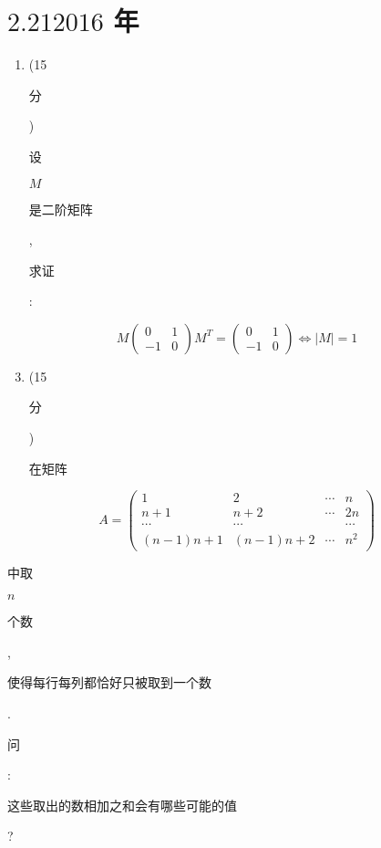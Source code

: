 \documentclass[10pt]{article}
\begin{document}
\section{$2.212016$ 年}
\begin{enumerate}
  \item (15 \begin{CJK}{UTF8}{mj}分\end{CJK}) \begin{CJK}{UTF8}{mj}设\end{CJK} $M$ \begin{CJK}{UTF8}{mj}是二阶矩阵\end{CJK}, \begin{CJK}{UTF8}{mj}求证\end{CJK}:
\end{enumerate}
$$
M\left(\begin{array}{cc}
0 & 1 \\
-1 & 0
\end{array}\right) M^{T}=\left(\begin{array}{cc}
0 & 1 \\
-1 & 0
\end{array}\right) \Leftrightarrow|M|=1
$$

\begin{enumerate}
  \setcounter{enumi}{2}
  \item (15 \begin{CJK}{UTF8}{mj}分\end{CJK}) \begin{CJK}{UTF8}{mj}在矩阵\end{CJK}
\end{enumerate}
$$
A=\left(\begin{array}{cccc}
1 & 2 & \cdots & n \\
n+1 & n+2 & \cdots & 2 n \\
\cdots & \cdots & & \cdots \\
(n-1) n+1 & (n-1) n+2 & \cdots & n^{2}
\end{array}\right)
$$
\begin{CJK}{UTF8}{mj}中取\end{CJK} $n$ \begin{CJK}{UTF8}{mj}个数\end{CJK}, \begin{CJK}{UTF8}{mj}使得每行每列都恰好只被取到一个数\end{CJK}. \begin{CJK}{UTF8}{mj}问\end{CJK}: \begin{CJK}{UTF8}{mj}这些取出的数相加之和会有哪些可能的值\end{CJK}?
\end{document}
